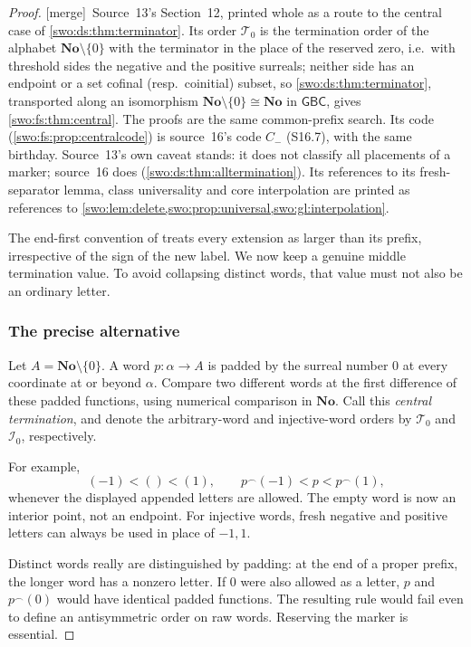 \documentclass[11pt]{article}
\theoremstyle{definition}
\theoremstyle{remark}
\newcommand{\No}{\mathbf{No}}
\newcommand{\I}{\mathcal I}
\newcommand{\WordsAll}{\mathcal T}
\newcommand{\cat}{\mathbin{{}^\frown}}
\newcommand{\GBC}{\mathsf{GBC}}
\newcommand{\merge}{\textsf{[merge]}}
\begin{document}
\begin{proof}
\merge\ Source~13's Section~12, printed whole as a route to the central case
of \cref{swo:ds:thm:terminator}. Its order $\WordsAll_0$ is the termination
order of the alphabet $\No\setminus\{0\}$ with the terminator in the place of
the reserved zero, i.e.\ with threshold sides the negative and the positive
surreals; neither side has an endpoint or a set cofinal (resp.\ coinitial)
subset, so \cref{swo:ds:thm:terminator}, transported along an isomorphism
$\No\setminus\{0\}\cong\No$ in $\GBC$, gives \cref{swo:fs:thm:central}. The
proofs are the same common-prefix search. Its code (\cref{swo:fs:prop:centralcode})
is source~16's code $C_-$ (S16.7), with the same birthday. Source~13's own
caveat stands: it does not classify all placements of a marker; source~16
does (\cref{swo:ds:thm:alltermination}). Its references to its fresh-separator
lemma, class universality and core interpolation are printed as references to
\cref{swo:lem:delete,swo:prop:universal,swo:gl:interpolation}.

The end-first convention of  treats every
extension as larger than its prefix, irrespective of the sign of the
new label. We now keep a genuine middle termination value. To avoid
collapsing distinct words, that value must not also be an ordinary
letter.

\subsubsection{The precise alternative}

Let $A=\No\setminus\{0\}$. A word $p:\alpha\to A$ is padded by the
surreal number $0$ at every coordinate at or beyond $\alpha$. Compare
two different words at the first difference of these padded functions,
using numerical comparison in $\No$. Call this \emph{central
termination}, and denote the arbitrary-word and injective-word orders
by $\WordsAll_0$ and $\I_0$, respectively.

For example,
\[
       (-1)<()<(1),\qquad
       p\cat(-1)<p<p\cat(1),
\]
whenever the displayed appended letters are allowed. The empty word
is now an interior point, not an endpoint. For injective words, fresh
negative and positive letters can always be used in place of $-1,1$.

Distinct words really are distinguished by padding: at the end of a
proper prefix, the longer word has a nonzero letter. If $0$ were also
allowed as a letter, $p$ and $p\cat(0)$ would have identical padded
functions. The resulting rule would fail even to define an
antisymmetric order on raw words. Reserving the marker is essential.


\end{proof}
\end{document}
